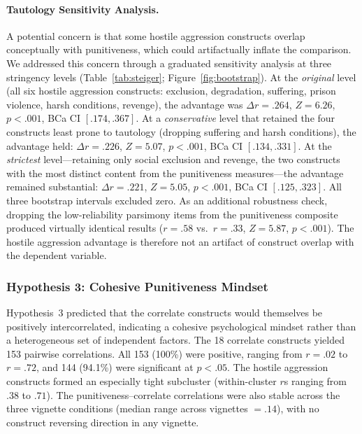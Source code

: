 \paragraph{Tautology Sensitivity Analysis.} A potential concern is that some hostile aggression constructs overlap conceptually with punitiveness, which could artifactually inflate the comparison. We addressed this concern through a graduated sensitivity analysis at three stringency levels (Table~\ref{tab:steiger}; Figure~\ref{fig:bootstrap}). At the \textit{original} level (all six hostile aggression constructs: exclusion, degradation, suffering, prison violence, harsh conditions, revenge), the advantage was $\Delta r = .264$, $Z = 6.26$, $p < .001$, BCa CI $[.174, .367]$. At a \textit{conservative} level that retained the four constructs least prone to tautology (dropping suffering and harsh conditions), the advantage held: $\Delta r = .226$, $Z = 5.07$, $p < .001$, BCa CI $[.134, .331]$. At the \textit{strictest} level---retaining only social exclusion and revenge, the two constructs with the most distinct content from the punitiveness measures---the advantage remained substantial: $\Delta r = .221$, $Z = 5.05$, $p < .001$, BCa CI $[.125, .323]$. All three bootstrap intervals excluded zero. As an additional robustness check, dropping the low-reliability parsimony items from the punitiveness composite produced virtually identical results ($r = .58$ vs.\ $r = .33$, $Z = 5.87$, $p < .001$). The hostile aggression advantage is therefore not an artifact of construct overlap with the dependent variable.

\subsubsection{Hypothesis 3: Cohesive Punitiveness Mindset}

Hypothesis~3 predicted that the correlate constructs would themselves be positively intercorrelated, indicating a cohesive psychological mindset rather than a heterogeneous set of independent factors. The 18 correlate constructs yielded 153 pairwise correlations. All 153 (100\%) were positive, ranging from $r = .02$ to $r = .72$, and 144 (94.1\%) were significant at $p < .05$. The hostile aggression constructs formed an especially tight subcluster (within-cluster $r$s ranging from $.38$ to $.71$). The punitiveness--correlate correlations were also stable across the three vignette conditions (median range across vignettes $= .14$), with no construct reversing direction in any vignette.

